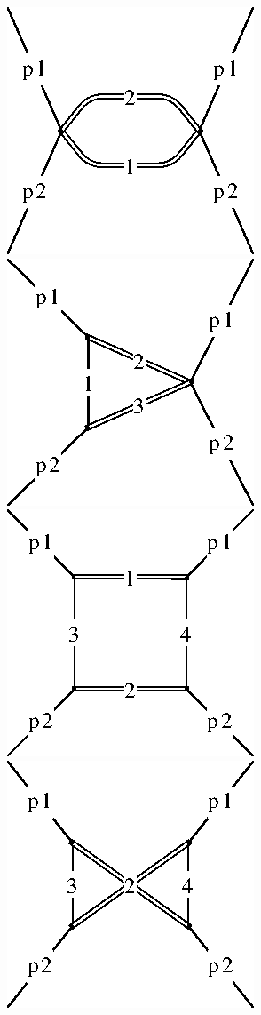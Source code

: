 \documentclass{article}
\begin{document}
\begin{figure}
  \centering
  \includegraphics[scale=0.8]{top-type.1.eps}\hspace*{1.5pc}
  \includegraphics[scale=0.8]{top-type.2.eps}\hspace*{1.5pc}
  \includegraphics[scale=0.8]{top-type.3.eps}\hspace*{1.5pc}
  \includegraphics[scale=0.8]{top-type.4.eps}

\end{figure}
\end{document}
